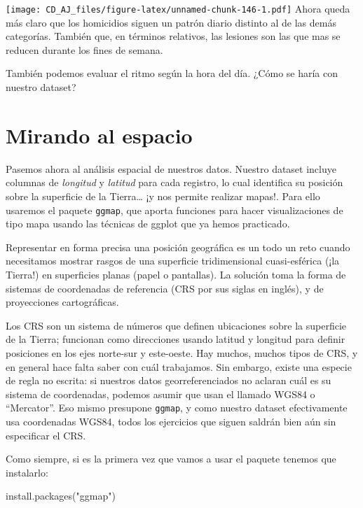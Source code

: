 \documentclass[
]{book}
\newenvironment{Shaded}{\begin{snugshade}}{\end{snugshade}}
\newcommand{\FunctionTok}[1]{\textcolor[rgb]{0.00,0.00,0.00}{#1}}
\newcommand{\NormalTok}[1]{#1}
\newcommand{\StringTok}[1]{\textcolor[rgb]{0.31,0.60,0.02}{#1}}
\begin{document}
\texttt{[image: CD\_AJ\_files/figure-latex/unnamed-chunk-146-1.pdf]}
Ahora queda más claro que los homicidios siguen un patrón diario distinto al de las demás categorías. También que, en términos relativos, las lesiones son las que mas se reducen durante los fines de semana.

También podemos evaluar el ritmo según la hora del día. ¿Cómo se haría con nuestro dataset?

\hypertarget{mirando-al-espacio}{%
\section{Mirando al espacio}\label{mirando-al-espacio}}

Pasemos ahora al análisis espacial de nuestros datos. Nuestro dataset incluye columnas de \emph{longitud} y \emph{latitud} para cada registro, lo cual identifica su posición sobre la superficie de la Tierra\ldots{} ¡y nos permite realizar mapas!. Para ello usaremos el paquete \texttt{ggmap}, que aporta funciones para hacer visualizaciones de tipo mapa usando las técnicas de ggplot que ya hemos practicado.

Representar en forma precisa una posición geográfica es un todo un reto cuando necesitamos mostrar rasgos de una superficie tridimensional cuasi-esférica (¡la Tierra!) en superficies planas (papel o pantallas). La solución toma la forma de sistemas de coordenadas de referencia (CRS por sus siglas en inglés), y de proyecciones cartográficas.

Los CRS son un sistema de números que definen ubicaciones sobre la superficie de la Tierra; funcionan como direcciones usando latitud y longitud para definir posiciones en los ejes norte-sur y este-oeste. Hay muchos, muchos tipos de CRS, y en general hace falta saber con cuál trabajamos. Sin embargo, existe una especie de regla no escrita: si nuestros datos georreferenciados no aclaran cuál es su sistema de coordenadas, podemos asumir que usan el llamado WGS84 o ``Mercator''. Eso mismo presupone \texttt{ggmap}, y como nuestro dataset efectivamente usa coordenadas WGS84, todos los ejercicios que siguen saldrán bien aún sin especificar el CRS.

Como siempre, si es la primera vez que vamos a usar el paquete tenemos que instalarlo:

\begin{Shaded}
\begin{Highlighting}[]
\FunctionTok{install.packages}\NormalTok{(}\StringTok{"ggmap"}\NormalTok{)}
\end{Highlighting}
\end{Shaded}
\end{document}
